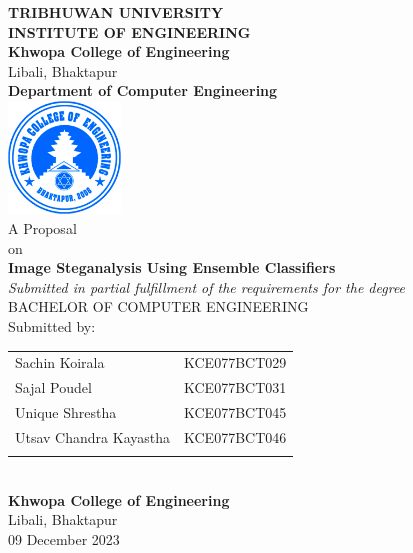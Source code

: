 \begin{center}
\thispagestyle{empty} %
\large{\bf{TRIBHUWAN UNIVERSITY \\ INSTITUTE OF ENGINEERING}}\\
\vspace{0.3cm}
\normalsize{\bf{Khwopa College of Engineering}} \\
\small{ Libali, Bhaktapur} \\
\normalsize{\bf{Department of Computer Engineering}} \\
\parskip 10mm
\includegraphics [width =30mm] {./img/Khwopalogo.jpg} \\
\vspace{0.3cm}
\normalsize{A Proposal \\ on} \\
\normalsize{\bf{Image Steganalysis Using Ensemble Classifiers  }} \\
\normalsize{\textit{Submitted in partial fulfillment of the requirements for the degree}}
\vspace{0.3cm} \\
\large{BACHELOR OF COMPUTER ENGINEERING}\\
\vspace{3.5cm}
Submitted by:\\
\begin{tabular}{p{3.5in}p{3in}}
\hspace{0.3cm}Sachin Koirala&KCE077BCT029\\
\hspace{0.3cm}Sajal Poudel&KCE077BCT031\\
\hspace{0.3cm}Unique Shrestha&KCE077BCT045\\
\hspace{0.3cm}Utsav Chandra Kayastha&KCE077BCT046\\
\vspace{0.3cm}
\end{tabular}
\vspace{0.3cm} \\
\Large{\bf{Khwopa College of Engineering}}\\
\small{Libali, Bhaktapur}\\
\small{09 December 2023}
\end{center}

